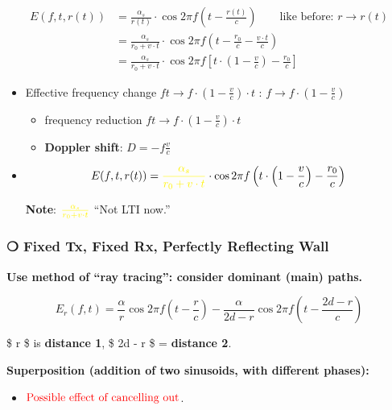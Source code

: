 \documentclass[11pt]{article}
\providecommand{\tightlist}{%
      \setlength{\itemsep}{0pt}\setlength{\parskip}{0pt}}
\begin{document}
\begin{align}
E(f, t, r(t)) &= \frac{\alpha_s}{r(t)} \cdot \cos 2 \pi f \left( t - \frac{r(t)}{c} \right) \qquad \text{like before: } r \to r(t) \\
&= \frac{\alpha_s}{r_0 + v \cdot t} \cdot \cos 2 \pi f \left( t - \frac{r_0}{c} - \frac{v \cdot t}{c} \right)\\
&= \frac{\alpha_s}{r_0 + v \cdot t} \cdot \cos 2 \pi f \left[t \cdot \left( 1 - \frac{v}{c} \right) - \frac{r_0}{c} \right]
\end{align}

\begin{itemize}
\item
  Effective frequency change
  \(f t \to f \cdot \left( 1 - \frac{v}{c} \right) \cdot t\) :
  \(f \to f \cdot \left( 1 - \frac{v}{c} \right)\)

  \begin{itemize}
  \tightlist
  \item
    frequency reduction
    \(f t \to f \cdot \left( 1 - \frac{v}{c} \right) \cdot t\)
  \item
    \textbf{Doppler shift}: \(D = -f \frac{v}{c}\)
  \end{itemize}
\item
  \[
  E(f, t, r(t)) = {\color{yellow}\frac{\alpha_s}{r_0 + v \cdot t}} \cdot \cos 2 \pi f \left( t \cdot \left( 1 - \frac{v}{c} \right) - \frac{r_0}{c} \right)
  \]

  \textbf{Note}: \({\color{yellow}\frac{\alpha_s}{r_0 + v \cdot t}}\)
  ``Not LTI now.''
\end{itemize}

    \subsubsection{❍ Fixed Tx, Fixed Rx, Perfectly Reflecting
Wall}\label{fixed-tx-fixed-rx-perfectly-reflecting-wall}

\textbf{Use method of ``ray tracing'': consider dominant (main) paths.}

\[
E_r(f, t) = \frac{\alpha}{r} \cos 2 \pi f \left( t - \frac{r}{c} \right) - \frac{\alpha}{2d - r} \cos 2 \pi f \left( t - \frac{2d - r}{c} \right)
\]

\$ \qquad \qquad \qquad r \$ is \textbf{distance 1}, \$ \qquad 2d - r \$
= \textbf{distance 2}.

\textbf{Superposition (addition of two sinusoids, with different
phases):}

\begin{itemize}
\tightlist
\item
  \textbf{\(\color{red}\text{Possible effect of cancelling out}\)}.
\end{itemize}
\end{document}
